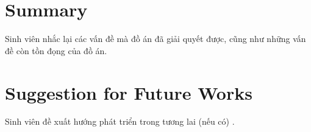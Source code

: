 \documentclass[../main.tex]{subfiles}
\begin{document}
\section{Summary}

Sinh viên nhắc lại các vấn đề mà đồ án đã giải quyết được, cũng như những vấn đề còn tồn đọng của đồ án.  

\section{Suggestion for Future Works }

Sinh viên đề xuất hướng phát triển trong tương lai (nếu có) .  
\end{document}
